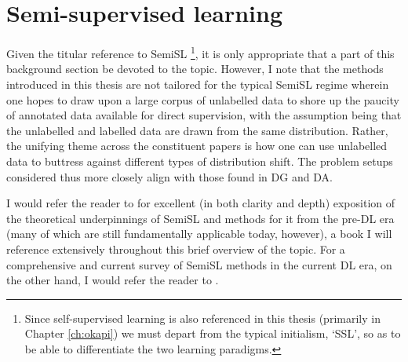 \section{ Semi-supervised learning }\label{sec:semisl}
%
Given the titular reference to \ac{SemiSL}
%
\footnote{ 
  Since self-supervised learning is also referenced in this thesis (primarily in Chapter
  \ref{ch:okapi}) we must depart from the typical initialism, `SSL', so as to be able to
  differentiate the two learning paradigms.
%
},
%
 it is only appropriate that a part of this background section be devoted to the
topic.
%
However, I note that the methods introduced in this thesis are not tailored for the typical
\ac{SemiSL} regime wherein one hopes to draw upon a large corpus of unlabelled data to shore up the
paucity of annotated data available for direct supervision, with the assumption being that the
unlabelled and labelled data are drawn from the same distribution.
%
Rather, the unifying theme across the constituent papers is how one can use unlabelled data to
buttress against different types of distribution shift.
%
The problem setups considered thus more closely align with those found in \ac{DG} and \ac{DA}. 

I would refer the reader to \cite{chapelle2009semi} for excellent (in both clarity and depth)
exposition of the theoretical underpinnings of \ac{SemiSL} and methods for it from the
pre-\ac{DL} era (many of which are still fundamentally applicable today, however), a book I
will reference extensively throughout this brief overview of the topic.
%
For a comprehensive and current survey of \ac{SemiSL} methods in the current \ac{DL} era, on the
other hand, I would refer the reader to \cite{yang2022survey}.
%

